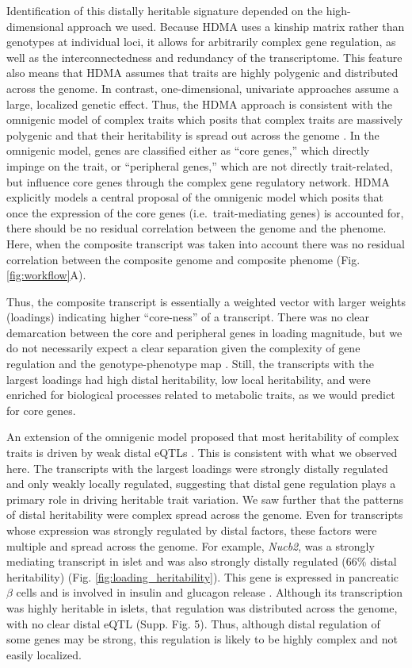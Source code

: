 \documentclass[
]{article}
\begin{document}
Identification of this distally heritable signature depended on the
high-dimensional approach we used. Because HDMA uses a kinship matrix
rather than genotypes at individual loci, it allows for arbitrarily
complex gene regulation, as well as the interconnectedness and
redundancy of the transcriptome. This feature also means that HDMA
assumes that traits are highly polygenic and distributed across the
genome. In contrast, one-dimensional, univariate approaches assume a
large, localized genetic effect. Thus, the HDMA approach is consistent
with the omnigenic model of complex traits which posits that complex
traits are massively polygenic and that their heritability is spread out
across the genome \cite{pmid28622505}. In the omnigenic model, genes are
classified either as ``core genes,'' which directly impinge on the
trait, or ``peripheral genes,'' which are not directly trait-related,
but influence core genes through the complex gene regulatory network.
HDMA explicitly models a central proposal of the omnigenic model which
posits that once the expression of the core genes (i.e.~trait-mediating
genes) is accounted for, there should be no residual correlation between
the genome and the phenome. Here, when the composite transcript was
taken into account there was no residual correlation between the
composite genome and composite phenome (Fig. \ref{fig:workflow}A).

Thus, the composite transcript is essentially a weighted vector with
larger weights (loadings) indicating higher ``core-ness'' of a
transcript. There was no clear demarcation between the core and
peripheral genes in loading magnitude, but we do not necessarily expect
a clear separation given the complexity of gene regulation and the
genotype-phenotype map \cite{pmid29906445}. Still, the transcripts with
the largest loadings had high distal heritability, low local
heritability, and were enriched for biological processes related to
metabolic traits, as we would predict for core genes.

An extension of the omnigenic model proposed that most heritability of
complex traits is driven by weak distal eQTLs \cite{pmid31051098}. This
is consistent with what we observed here. The transcripts with the
largest loadings were strongly distally regulated and only weakly
locally regulated, suggesting that distal gene regulation plays a
primary role in driving heritable trait variation. We saw further that
the patterns of distal heritability were complex spread across the
genome. Even for transcripts whose expression was strongly regulated by
distal factors, these factors were multiple and spread across the
genome. For example, \textit{Nucb2}, was a strongly mediating transcript
in islet and was also strongly distally regulated (66\% distal
heritability) (Fig. \ref{fig:loading_heritability}). This gene is
expressed in pancreatic \(\beta\) cells and is involved in insulin and
glucagon release \cite{pmid22108805, pmid23537085, pmid24993278}.
Although its transcription was highly heritable in islets, that
regulation was distributed across the genome, with no clear distal eQTL
(Supp. Fig. 5). Thus, although distal regulation of some genes may be
strong, this regulation is likely to be highly complex and not easily
localized.
\end{document}
